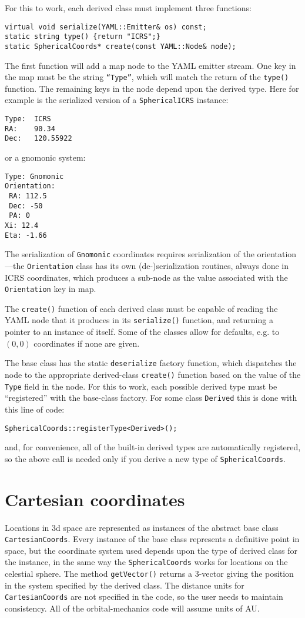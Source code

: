 \documentclass[11pt,preprint,flushrt]{aastex}
\begin{document}
For this to work, each derived class must implement three functions:
\begin{verbatim}
virtual void serialize(YAML::Emitter& os) const;
static string type() {return "ICRS";}
static SphericalCoords* create(const YAML::Node& node);
\end{verbatim}
The first function will add a map node to the YAML emitter stream.  One key in the map must be the string \texttt{``Type''}, which will match the return of the \texttt{type()} function.  The remaining keys in the node depend upon the derived type.  Here for example is the serialized version of a \texttt{SphericalICRS} instance:
\begin{verbatim}
Type:  ICRS
RA:    90.34
Dec:   120.55922
\end{verbatim}
or a gnomonic system:
\begin{verbatim}
Type: Gnomonic
Orientation:
 RA: 112.5
 Dec: -50
 PA: 0
Xi: 12.4
Eta: -1.66
\end{verbatim}
The serialization of \texttt{Gnomonic} coordinates requires serialization of the orientation---the \texttt{Orientation} class has its own (de-)serialization routines, always done in ICRS coordinates, which produces a sub-node as the value associated with the \texttt{Orientation} key in map.

The \texttt{create()} function of each derived class must be capable of reading the YAML node that it produces in its \texttt{serialize()} function, and returning a pointer to an instance of itself.  Some of the classes allow for defaults, e.g. to $(0,0)$ coordinates if none are given.

The base class has the static \texttt{deserialize} factory function, which dispatches the node to the appropriate derived-class \texttt{create()} function based on the value of the \texttt{Type} field in the node.  For this to work, each possible derived type must be ``registered'' with the base-class factory.  For some class \texttt{Derived} this is done with this line of code:
\begin{verbatim}
SphericalCoords::registerType<Derived>();
\end{verbatim}
and, for convenience, all of the built-in derived types are automatically registered, so the above call is needed only if you derive a new type of \texttt{SphericalCoords}.


\section{Cartesian coordinates}
Locations in 3d space are represented as instances of the abstract base class {\tt CartesianCoords}. Every instance of the base class represents a definitive point in space, but the coordinate system used depends upon the type of derived class for the instance, in the same way the {\tt SphericalCoords} works for locations on the celestial sphere.  The method {\tt getVector()} returns a 3-vector giving the position in the system specified by the derived class.  The distance units for {\tt CartesianCoords} are not specified in the code, so the user needs to maintain consistency.  All of the orbital-mechanics code will assume units of AU.
\end{document}
